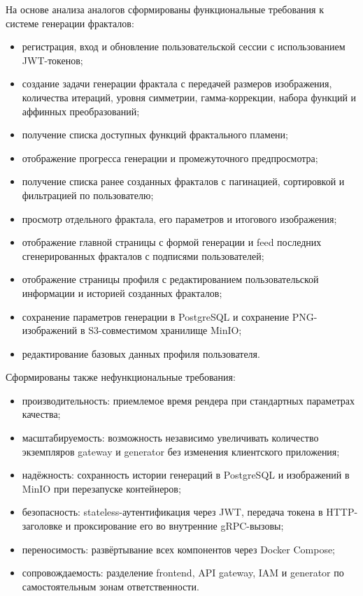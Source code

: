 На основе анализа аналогов сформированы функциональные требования к системе генерации фракталов:
\begin{itemize}
  \item регистрация, вход и обновление пользовательской сессии с использованием JWT-токенов;
  \item создание задачи генерации фрактала с передачей размеров изображения, количества итераций, уровня симметрии, гамма-коррекции, набора функций и аффинных преобразований;
  \item получение списка доступных функций фрактального пламени;
  \item отображение прогресса генерации и промежуточного предпросмотра;
  \item получение списка ранее созданных фракталов с пагинацией, сортировкой и фильтрацией по пользователю;
  \item просмотр отдельного фрактала, его параметров и итогового изображения;
  \item отображение главной страницы с формой генерации и feed последних сгенерированных фракталов с подписями пользователей;
  \item отображение страницы профиля с редактированием пользовательской информации и историей созданных фракталов;
  \item сохранение параметров генерации в PostgreSQL и сохранение PNG-изображений в S3-совместимом хранилище MinIO;
  \item редактирование базовых данных профиля пользователя.
\end{itemize}

Сформированы также нефункциональные требования:
\begin{itemize}
  \item производительность: приемлемое время рендера при стандартных параметрах качества;
  \item масштабируемость: возможность независимо увеличивать количество экземпляров gateway и generator без изменения клиентского приложения;
  \item надёжность: сохранность истории генераций в PostgreSQL и изображений в MinIO при перезапуске контейнеров;
  \item безопасность: stateless-аутентификация через JWT, передача токена в HTTP-заголовке и проксирование его во внутренние gRPC-вызовы;
  \item переносимость: развёртывание всех компонентов через Docker Compose;
  \item сопровождаемость: разделение frontend, API gateway, IAM и generator по самостоятельным зонам ответственности.
\end{itemize}

